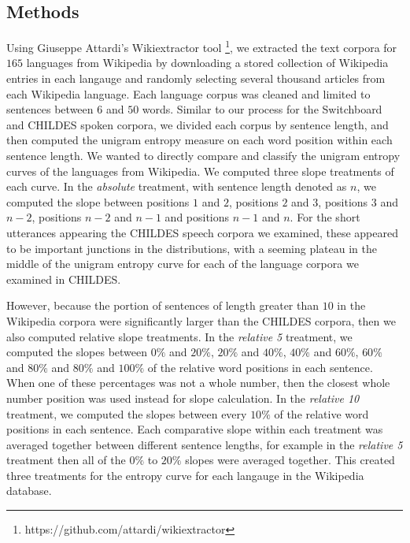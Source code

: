 \documentclass[10pt, letterpaper]{article}
\begin{document}
\subsection{Methods}\label{methods-1}

Using Giuseppe Attardi's Wikiextractor tool
\footnote{https://github.com/attardi/wikiextractor}, we extracted the
text corpora for \(165\) languages from Wikipedia by downloading a
stored collection of Wikipedia entries in each langauge and randomly
selecting several thousand articles from each Wikipedia language. Each
language corpus was cleaned and limited to sentences between \(6\) and
\(50\) words. Similar to our process for the Switchboard and CHILDES
spoken corpora, we divided each corpus by sentence length, and then
computed the unigram entropy measure on each word position within each
sentence length. We wanted to directly compare and classify the unigram
entropy curves of the languages from Wikipedia. We computed three slope
treatments of each curve. In the \emph{absolute} treatment, with
sentence length denoted as \(n\), we computed the slope between
positions \(1\) and \(2\), positions \(2\) and \(3\), positions \(3\)
and \(n-2\), positions \(n-2\) and \(n-1\) and positions \(n-1\) and
\(n\). For the short utterances appearing the CHILDES speech corpora we
examined, these appeared to be important junctions in the distributions,
with a seeming plateau in the middle of the unigram entropy curve for
each of the language corpora we examined in CHILDES.

However, because the portion of sentences of length greater than \(10\)
in the Wikipedia corpora were significantly larger than the CHILDES
corpora, then we also computed relative slope treatments. In the
\emph{relative 5} treatment, we computed the slopes between \(0\%\) and
\(20\%\), \(20\%\) and \(40\%\), \(40\%\) and \(60\%\), \(60\%\) and
\(80\%\) and \(80\%\) and \(100\%\) of the relative word positions in
each sentence. When one of these percentages was not a whole number,
then the closest whole number position was used instead for slope
calculation. In the \emph{relative 10} treatment, we computed the slopes
between every \(10\%\) of the relative word positions in each sentence.
Each comparative slope within each treatment was averaged together
between different sentence lengths, for example in the \emph{relative 5}
treatment then all of the \(0\%\) to \(20\%\) slopes were averaged
together. This created three treatments for the entropy curve for each
langauge in the Wikipedia database.
\end{document}
